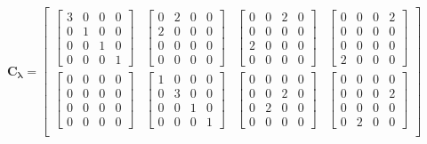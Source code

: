 \documentclass[twocolumn,10pt]{asme2ej}
\begin{document}
\begin{equation}
    \bm{C_{\lambda}} = \begin{bmatrix}
    \begin{bmatrix} 3 & 0 & 0 & 0 \\ 0 & 1 & 0 & 0 \\ 0 & 0 & 1 & 0 \\ 0 & 0 & 0 & 1 \end{bmatrix} &
    \begin{bmatrix} 0 & 2 & 0 & 0 \\ 2 & 0 & 0 & 0 \\ 0 & 0 & 0 & 0 \\ 0 & 0 & 0 & 0 \end{bmatrix} &
    \begin{bmatrix} 0 & 0 & 2 & 0 \\ 0 & 0 & 0 & 0 \\ 2 & 0 & 0 & 0 \\ 0 & 0 & 0 & 0 \end{bmatrix} &
    \begin{bmatrix}0 & 0 & 0 & 2 \\ 0 & 0 & 0 & 0 \\ 0 & 0 & 0 & 0 \\ 2 & 0 & 0 & 0 \end{bmatrix} \\
      \begin{bmatrix} 0 & 0 & 0 & 0 \\ 0 & 0 & 0 & 0 \\ 0 & 0 & 0 & 0 \\ 0 & 0 & 0 & 0 \end{bmatrix} &
      \begin{bmatrix} 1 & 0 & 0 & 0 \\ 0 & 3 & 0 & 0 \\ 0 & 0 & 1 & 0 \\ 0 & 0 & 0 & 1 \end{bmatrix} &
      \begin{bmatrix} 0 & 0 & 0 & 0 \\ 0 & 0 & 2 & 0 \\ 0 & 2 & 0 & 0 \\ 0 & 0 & 0 & 0 \end{bmatrix} &
      \begin{bmatrix}0 & 0 & 0 & 0 \\ 0 & 0 & 0 & 2 \\ 0 & 0 & 0 & 0 \\ 0 & 2 & 0 & 0 \end{bmatrix} \\

\end{bmatrix}
\end{equation}
\end{document}
